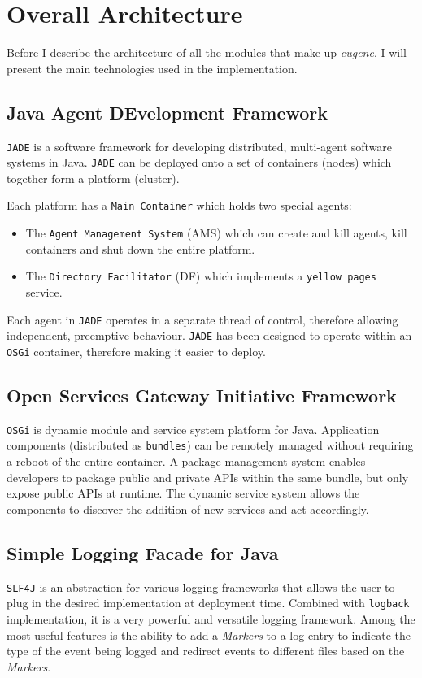 \section{Overall Architecture}
Before I describe the architecture of all the modules that make up \textit{eugene}, I will present the main technologies used in the implementation.

\subsection{Java Agent DEvelopment Framework}
\texttt{JADE} is a software framework for developing distributed, multi-agent software systems in Java. \texttt{JADE} can be deployed onto a set of containers (nodes) which together form a platform (cluster).

Each platform has a \texttt{Main Container} which holds two special agents:
\begin{itemize}
\item The \texttt{Agent Management System} (AMS) which can create and kill agents, kill containers and shut down the entire platform.
\item The \texttt{Directory Facilitator} (DF) which implements a \texttt{yellow pages} service.
\end{itemize} 

Each agent in \texttt{JADE} operates in a separate thread of control, therefore allowing independent, preemptive behaviour. \texttt{JADE}  has been designed to operate within an \texttt{OSGi} container, therefore making it easier to deploy.

\subsection{Open Services Gateway Initiative Framework}
\texttt{OSGi} is dynamic module and service system platform for Java. Application components (distributed as \texttt{bundles}) can be remotely managed without requiring a reboot of the entire container. A package management system enables developers to package public and private APIs within the same bundle, but only expose public APIs at runtime. The dynamic service system allows the components to discover the addition of new services and act accordingly.

\subsection{Simple Logging Facade for Java}
\texttt{SLF4J} is an abstraction for various logging frameworks that allows the user to plug in the desired implementation at deployment time. Combined with \texttt{logback} implementation, it is a very powerful and versatile logging framework. Among the most useful features is the ability to add a \textit{Markers} to a log entry to indicate the type of the event being logged and redirect events to different files based on the \textit{Markers}.
